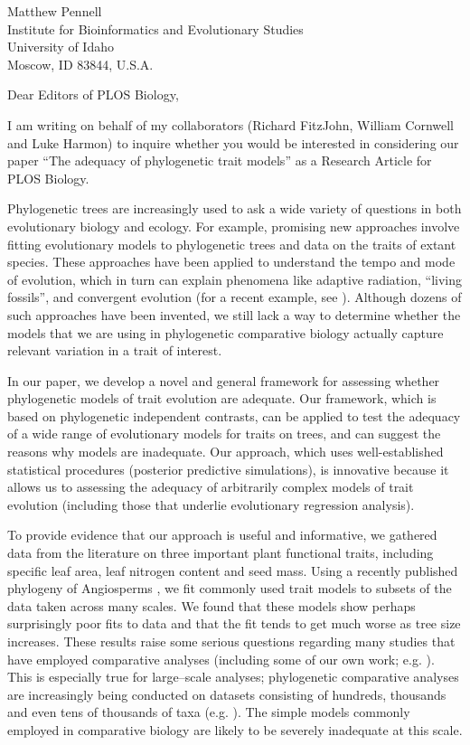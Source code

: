 \documentclass[a4paper,12pt]{article}
\begin{document}
{\raggedright
  Matthew Pennell\\
  Institute for Bioinformatics and Evolutionary Studies\\
  University of Idaho\\
 Moscow, ID 83844, U.S.A.\\[2ex]
}

\vspace{3ex}

Dear Editors of PLOS Biology,

I am writing on behalf of my collaborators (Richard FitzJohn, William Cornwell and Luke Harmon) to inquire whether you would be interested in considering our paper ``The adequacy of phylogenetic trait models'' as a Research Article for PLOS Biology. 

Phylogenetic trees are increasingly used to ask a wide variety of questions in both evolutionary biology and ecology. For example, promising new approaches involve fitting evolutionary models to phylogenetic trees and data on the traits of extant species. These approaches have been applied to understand the tempo and mode of evolution, which in turn can explain phenomena like adaptive radiation, ``living fossils'', and convergent evolution (for a recent example, see \citep{Mahler2013}). Although dozens of such approaches have been invented, we still lack a way to determine whether the models that we are using in phylogenetic comparative biology actually capture relevant variation in a trait of interest. 

In our paper, we develop a novel and general framework for assessing whether phylogenetic models of trait evolution are adequate.  Our framework, which is based on phylogenetic independent contrasts, can be applied to test the adequacy of a wide range of evolutionary models for traits on trees, and can suggest the reasons why models are inadequate. Our approach, which uses well-established statistical procedures (posterior predictive simulations), is innovative because it allows us to assessing the adequacy of arbitrarily complex models of trait evolution (including those that underlie evolutionary regression analysis).

To provide evidence that our approach is useful and informative, we gathered data from the literature on three important plant functional traits, including specific leaf area, leaf nitrogen content and seed mass. Using a recently published phylogeny of Angiosperms \citep{Zanne2013}, we fit commonly used trait models to subsets of the data taken across many scales. We found that these models show perhaps surprisingly poor fits to data and that the fit tends to get much worse as tree size increases. These results raise some serious questions regarding many studies that have employed comparative analyses (including some of our own work; e.g. \citep{Harmon2010}). This is especially true for large--scale analyses; phylogenetic comparative analyses are increasingly being conducted on datasets consisting of hundreds, thousands and even tens of thousands of taxa (e.g. \citep{Venditti2011, Rabosky2013}). The simple models commonly employed in comparative biology are likely to be severely inadequate at this scale. 
\end{document}
